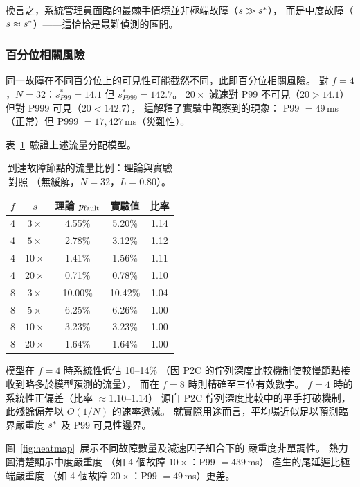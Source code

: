 換言之，系統管理員面臨的最棘手情境並非極端故障（$s \gg s^{*}$），
而是中度故障（$s \approx s^{*}$）——這恰恰是最難偵測的區間。

\subsubsection*{百分位相關風險}
同一故障在不同百分位上的可見性可能截然不同，此即百分位相關風險。
對 $f = 4$，$N = 32$：$s^{*}_{P99} = 14.1$ 但
$s^{*}_{P999} = 142.7$。
$20\times$ 減速對 P99 不可見（$20 > 14.1$）
但對 P999 可見（$20 < 142.7$），
這解釋了實驗中觀察到的現象：
P99 $= 49$\,ms（正常）但 P999 $= 17{,}427$\,ms（災難性）。

表~\ref{tab:pfault}~驗證上述流量分配模型。

\begin{table}[t]
\centering
\caption{到達故障節點的流量比例：理論與實驗對照
  （無緩解，$N=32$，$L=0.80$）。}
\label{tab:pfault}
\begin{tabular}{@{}ccccc@{}}
\toprule
$f$ & $s$ & 理論 $p_{\text{fault}}$ & 實驗值 & 比率 \\
\midrule
4 & $3\times$ & 4.55\% & 5.20\% & 1.14 \\
4 & $5\times$ & 2.78\% & 3.12\% & 1.12 \\
4 & $10\times$ & 1.41\% & 1.56\% & 1.11 \\
4 & $20\times$ & 0.71\% & 0.78\% & 1.10 \\
\midrule
8 & $3\times$ & 10.00\% & 10.42\% & 1.04 \\
8 & $5\times$ & 6.25\% & 6.26\% & 1.00 \\
8 & $10\times$ & 3.23\% & 3.23\% & 1.00 \\
8 & $20\times$ & 1.64\% & 1.64\% & 1.00 \\
\bottomrule
\end{tabular}
\end{table}

模型在 $f=4$ 時系統性低估 10--14\%
（因 P2C 的佇列深度比較機制使較慢節點接收到略多於模型預測的流量），
而在 $f=8$ 時則精確至三位有效數字。
$f = 4$ 時的系統性正偏差（比率 $\approx 1.10$--$1.14$）
源自 P2C 佇列深度比較中的平手打破機制，此殘餘偏差以 $O(1/N)$ 的速率遞減。
就實際用途而言，平均場近似足以預測臨界嚴重度 $s^{*}$
及 P99 可見性邊界。

圖~\ref{fig:heatmap}~展示不同故障數量及減速因子組合下的
嚴重度非單調性。
熱力圖清楚顯示中度嚴重度
（如 4 個故障 $10\times$：P99 $= 439$\,ms）
產生的尾延遲比極端嚴重度
（如 4 個故障 $20\times$：P99 $= 49$\,ms）更差。

